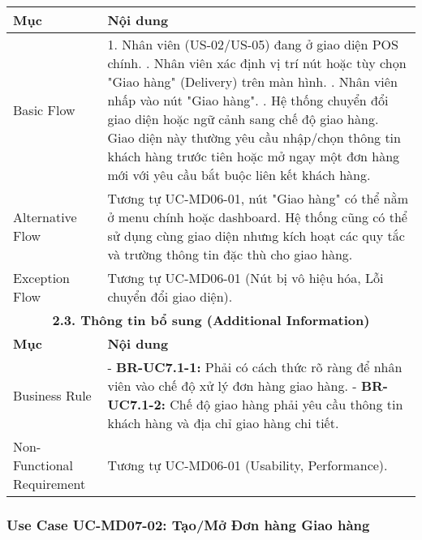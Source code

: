 \begin{longtable}{|m{4cm}|p{11cm}|}
\hline
\textbf{Mục} & \textbf{Nội dung} \\
\hline
Basic Flow & 1. Nhân viên (US-02/US-05) đang ở giao diện POS chính. \newline 2. Nhân viên xác định vị trí nút hoặc tùy chọn "Giao hàng" (Delivery) trên màn hình. \newline 3. Nhân viên nhấp vào nút "Giao hàng". \newline 4. Hệ thống chuyển đổi giao diện hoặc ngữ cảnh sang chế độ giao hàng. Giao diện này thường yêu cầu nhập/chọn thông tin khách hàng trước tiên hoặc mở ngay một đơn hàng mới với yêu cầu bắt buộc liên kết khách hàng. \\
\hline
Alternative Flow & Tương tự UC-MD06-01, nút "Giao hàng" có thể nằm ở menu chính hoặc dashboard. Hệ thống cũng có thể sử dụng cùng giao diện nhưng kích hoạt các quy tắc và trường thông tin đặc thù cho giao hàng. \\
\hline
Exception Flow & Tương tự UC-MD06-01 (Nút bị vô hiệu hóa, Lỗi chuyển đổi giao diện). \\
\hline
\multicolumn{2}{|c|}{\textbf{2.3. Thông tin bổ sung (Additional Information)}} \\
\hline
\textbf{Mục} & \textbf{Nội dung} \\
\hline
Business Rule & - \textbf{BR-UC7.1-1:} Phải có cách thức rõ ràng để nhân viên vào chế độ xử lý đơn hàng giao hàng. \newline - \textbf{BR-UC7.1-2:} Chế độ giao hàng phải yêu cầu thông tin khách hàng và địa chỉ giao hàng chi tiết. \\
\hline
Non-Functional Requirement & Tương tự UC-MD06-01 (Usability, Performance). \\
\hline
\end{longtable}

\subsubsection{Use Case UC-MD07-02: Tạo/Mở Đơn hàng Giao hàng}


